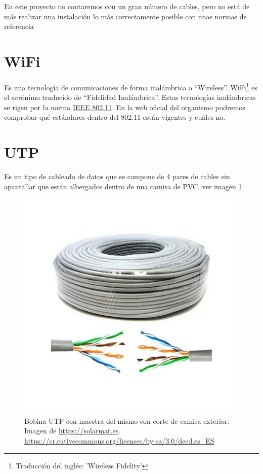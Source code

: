 En este proyecto no contaremos con un gran número de cables, pero no está de más realizar una instalación lo más correctamente posible con unas normas de referencia

\section{WiFi}
Es una tecnología de comunicaciones de forma inalámbrica o “Wireless”. WiFi\footnote{Traducción del inglés: 'Wireless Fidelity'} es el acrónimo traducido de “Fidelidad Inalámbrica”.
Estas tecnologías inalámbricas se rigen por la norma \underline{IEEE 802.11}\cite{manual:IEEE802.11}.
En la web oficial del organismo podremos comprobar qué estándares dentro del 802.11 están vigentes y cuáles no.

\section{UTP}
Es un tipo de cableado de datos que se compone de 4 pares de cables sin apantallar que están albergados dentro de una camisa de PVC, ver imagen \ref{Img:Bobina UTP}

\begin{figure}
    \centering
    \includegraphics[width=.6\textwidth]{img/bobina_UTP.pdf}
    \caption{Bobina UTP con muestra del mismo con corte de camisa exterior. Imagen de \url{https://solarmat.es}\cite{wiki:Creative}. \url{https://cr.eativecommons.org/licenses/by-sa/3.0/deed.es_ES} } \label{Img:Bobina UTP}
\end{figure}

